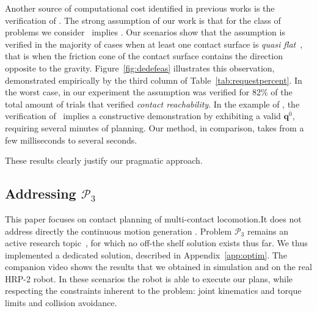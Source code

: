Another source of computational cost identified in previous works is the verification of \equilibriumfeasibility. 
The strong assumption of our work is that for the class of problems we consider \contactreachability\ implies \equilibriumfeasibility.
Our scenarios show that the  assumption is verified in the majority of cases when at least one contact surface is \textit{quasi flat}~\cite{Prete2016}, that is when
the friction cone of the contact surface contains the direction opposite to the gravity.
Figure~\ref{fig:dedefeas} illustrates this observation, demonstrated empirically by the third column of Table~\ref{tab:requestpercent}. In the worst case, in our experiment
the assumption was verified for 82\% of the total amount of trials that verified \textit{contact reachability}.
In the example of \cite{Bouyarmane2009}, the verification of \equilibriumfeasibility\ implies a constructive demonstration by exhibiting a valid $\mathbf{q}^{\overline{0}}$, requiring
several minutes of planning. Our method, in comparison, takes from a few milliseconds to several seconds.

These results clearly justify our pragmatic approach.

\subsection{Addressing $\mathcal{P}_3$}
This paper focuses on contact planning of multi-contact locomotion.It does not address directly the continuous motion generation
. Problem $\mathcal{P}_3$ remains an active research topic~\cite{Carpentier2016, herzog2015trajectory},
for which no off-the shelf solution exists thus far. We thus implemented a dedicated solution, described in Appendix~\ref{app:optim}.
The companion video shows the results that we obtained in simulation and on the real HRP-2 robot.
In these scenarios the robot is able to execute our plans, while respecting the constraints inherent to the problem: joint kinematics and torque limits and
collision avoidance.


